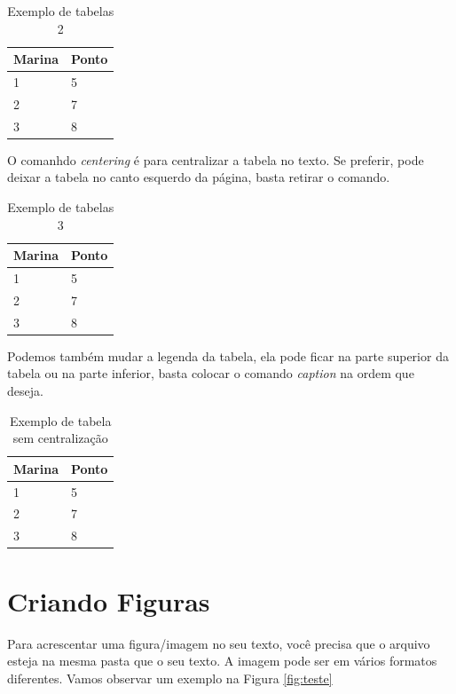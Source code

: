 \documentclass[12pt,a4paper]{article}
\begin{document}
\begin{table}[!h]
\centering
\caption{Exemplo de tabelas 2}
\label{tab:exemplo}
\begin{tabular}{|l|l|}
\hline
Marina & Ponto \\ \hline
1      & 5     \\ \hline
2      & 7     \\ \hline
3      & 8     \\ \hline
\end{tabular}
\end{table}

O comanhdo \textit{centering} é para centralizar a tabela no texto. Se preferir, pode deixar a tabela no canto esquerdo da página, basta retirar o comando.

\begin{table}[!h]
\caption{Exemplo de tabelas 3}
\label{tab:exemplo2}
\begin{tabular}{|l|l|}
\hline
Marina & Ponto \\ \hline
1      & 5     \\ \hline
2      & 7     \\ \hline
3      & 8     \\ \hline
\end{tabular}
\end{table}

Podemos também mudar a legenda da tabela, ela pode ficar na parte superior da tabela ou na parte inferior, basta colocar o comando \textit{caption} na ordem que deseja.

\begin{table}[!h]
\centering
\begin{tabular}{|l|l|}
\hline
Marina & Ponto  \\ \hline
1      & 5      \\ \hline
2      & 7      \\ \hline
3      & 8   \\ \hline
  \hline
\end{tabular}
\caption{Exemplo de tabela sem centralização}
\label{tab:ex2}
\end{table}


\section{Criando Figuras}
Para acrescentar uma figura/imagem no seu texto, você precisa que o arquivo esteja na mesma pasta que o seu texto. A imagem pode ser em vários formatos diferentes. Vamos observar um exemplo na Figura \ref{fig:teste}
\end{document}
